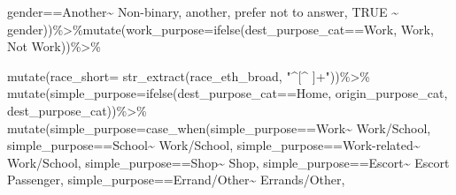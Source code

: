 \documentclass[
  12pt,
]{article}
\newenvironment{Shaded}{\begin{snugshade}}{\end{snugshade}}
\newcommand{\AttributeTok}[1]{\textcolor[rgb]{0.77,0.63,0.00}{#1}}
\newcommand{\ConstantTok}[1]{\textcolor[rgb]{0.00,0.00,0.00}{#1}}
\newcommand{\FunctionTok}[1]{\textcolor[rgb]{0.00,0.00,0.00}{#1}}
\newcommand{\NormalTok}[1]{#1}
\newcommand{\SpecialCharTok}[1]{\textcolor[rgb]{0.00,0.00,0.00}{#1}}
\newcommand{\StringTok}[1]{\textcolor[rgb]{0.31,0.60,0.02}{#1}}
\begin{document}
\begin{Shaded}
\begin{Highlighting}[]
\NormalTok{                               gender}\SpecialCharTok{==}\StringTok{\textquotesingle{}Another\textquotesingle{}}\SpecialCharTok{\textasciitilde{}} \StringTok{\textquotesingle{}Non{-}binary, another, prefer not to answer\textquotesingle{}}\NormalTok{,}
                               \ConstantTok{TRUE} \SpecialCharTok{\textasciitilde{}}\NormalTok{ gender))}\SpecialCharTok{\%\textgreater{}\%}\FunctionTok{mutate}\NormalTok{(}\AttributeTok{work\_purpose=}\FunctionTok{ifelse}\NormalTok{(dest\_purpose\_cat}\SpecialCharTok{==}\StringTok{\textquotesingle{}Work\textquotesingle{}}\NormalTok{, }\StringTok{\textquotesingle{}Work\textquotesingle{}}\NormalTok{, }\StringTok{\textquotesingle{}Not Work\textquotesingle{}}\NormalTok{))}\SpecialCharTok{\%\textgreater{}\%}
  
  \FunctionTok{mutate}\NormalTok{(}\AttributeTok{race\_short=} \FunctionTok{str\_extract}\NormalTok{(race\_eth\_broad,  }\StringTok{"\^{}[\^{} ]+"}\NormalTok{))}\SpecialCharTok{\%\textgreater{}\%}
  \FunctionTok{mutate}\NormalTok{(}\AttributeTok{simple\_purpose=}\FunctionTok{ifelse}\NormalTok{(dest\_purpose\_cat}\SpecialCharTok{==}\StringTok{\textquotesingle{}Home\textquotesingle{}}\NormalTok{, origin\_purpose\_cat, dest\_purpose\_cat))}\SpecialCharTok{\%\textgreater{}\%}
  \FunctionTok{mutate}\NormalTok{(}\AttributeTok{simple\_purpose=}\FunctionTok{case\_when}\NormalTok{(simple\_purpose}\SpecialCharTok{==}\StringTok{\textquotesingle{}Work\textquotesingle{}}\SpecialCharTok{\textasciitilde{}} \StringTok{\textquotesingle{}Work/School\textquotesingle{}}\NormalTok{,}
\NormalTok{                                  simple\_purpose}\SpecialCharTok{==}\StringTok{\textquotesingle{}School\textquotesingle{}}\SpecialCharTok{\textasciitilde{}} \StringTok{\textquotesingle{}Work/School\textquotesingle{}}\NormalTok{,}
\NormalTok{                                  simple\_purpose}\SpecialCharTok{==}\StringTok{\textquotesingle{}Work{-}related\textquotesingle{}}\SpecialCharTok{\textasciitilde{}} \StringTok{\textquotesingle{}Work/School\textquotesingle{}}\NormalTok{,}
\NormalTok{                                  simple\_purpose}\SpecialCharTok{==}\StringTok{\textquotesingle{}Shop\textquotesingle{}}\SpecialCharTok{\textasciitilde{}} \StringTok{\textquotesingle{}Shop\textquotesingle{}}\NormalTok{,}
\NormalTok{                                  simple\_purpose}\SpecialCharTok{==}\StringTok{\textquotesingle{}Escort\textquotesingle{}}\SpecialCharTok{\textasciitilde{}} \StringTok{\textquotesingle{}Escort Passenger\textquotesingle{}}\NormalTok{,}
\NormalTok{                                  simple\_purpose}\SpecialCharTok{==}\StringTok{\textquotesingle{}Errand/Other\textquotesingle{}}\SpecialCharTok{\textasciitilde{}} \StringTok{\textquotesingle{}Errands/Other\textquotesingle{}}\NormalTok{,}

\end{Highlighting}
\end{Shaded}
\end{document}
